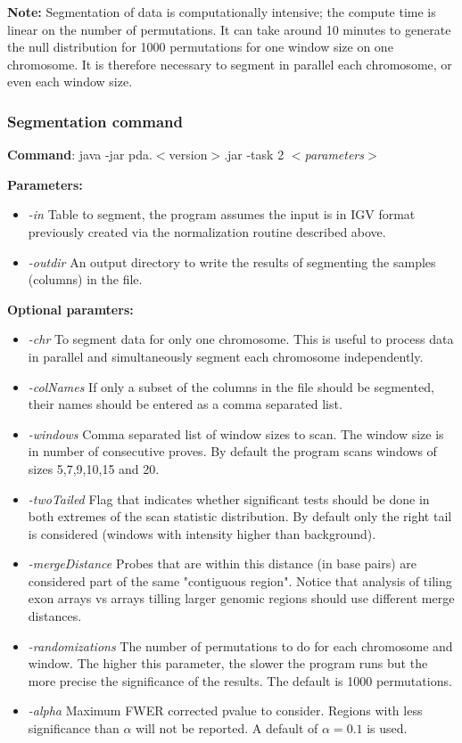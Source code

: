 \documentclass[11pt]{article}
\begin{document}
{\bf Note:} Segmentation of data is computationally intensive; the compute time is linear on the number of permutations. It can take around 10 minutes to generate the null distribution for 1000 permutations for one window size on one chromosome. It is therefore necessary to segment in parallel each chromosome, or even each window size.

\subsubsection{Segmentation command}
{\bf Command}: java -jar pda.$<$version$>$.jar -task 2 $<${\em parameters}$>$ 

{\bf Parameters:}
\begin{itemize}
\item {\em -in} Table to segment, the program assumes the input is in IGV format previously created via the normalization routine described above.
\item {\em -outdir} An output directory to write the results of segmenting the samples (columns) in the file.
\end{itemize}
{\bf Optional paramters:}
\begin{itemize}
\item {\em -chr} To segment data for only one chromosome. This is useful to process data in  parallel  and simultaneously segment each chromosome independently.
\item {\em -colNames} If only a subset of the columns in the file should be segmented, their names should be entered as a  comma separated list.
\item {\em -windows} Comma separated list of window sizes to scan. The window size is in number of consecutive proves. By default the program scans windows of sizes 5,7,9,10,15 and 20. 
\item {\em -twoTailed} Flag that indicates whether significant tests should be done in both extremes of the scan statistic distribution. By default only the right tail is considered (windows with intensity higher than background).
\item {\em -mergeDistance} Probes that are within this distance (in base pairs) are considered part of the same "contiguous region". Notice that analysis of  tiling exon arrays vs arrays tilling larger genomic regions should use different merge distances.
\item {\em -randomizations} The number of permutations to do for each chromosome and window. The higher this parameter, the slower the program runs but the more precise the significance of the results. The default is 1000 permutations.
\item {\em -alpha} Maximum FWER corrected pvalue to consider. Regions with less significance than $\alpha$ will not be reported. A default of $\alpha=0.1$ is used.
\end{itemize}
\end{document}
